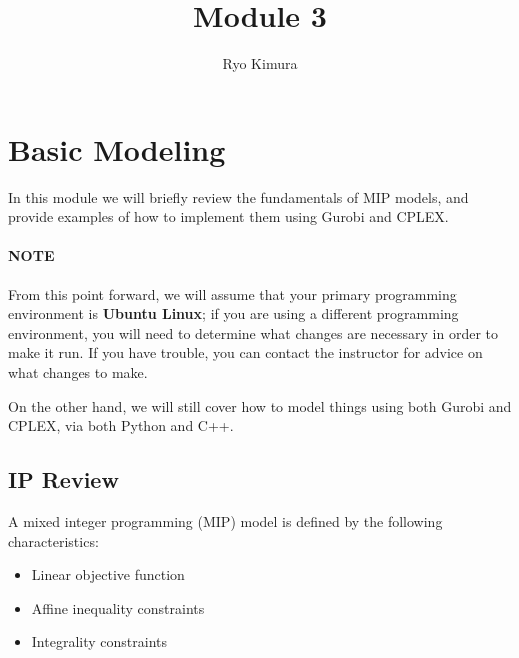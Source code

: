 \documentclass[12pt]{article}
\begin{document}
\title{Module 3}
\author{Ryo Kimura}
\maketitle

%
%
%
%
%

\setcounter{section}{2}
\section{Basic Modeling}
In this module we will briefly review the fundamentals of MIP models, and provide examples of how to implement them using Gurobi and CPLEX.

\paragraph{NOTE} From this point forward, we will assume that your primary programming environment is \textbf{Ubuntu Linux}; if you are using a different programming environment, you will need to determine what changes are necessary in order to make it run. If you have trouble, you can contact the instructor for advice on what changes to make.

On the other hand, we will still cover how to model things using both Gurobi and CPLEX, via both Python and C++.

\subsection{IP Review}
A mixed integer programming (MIP) model is defined by the following characteristics:
\begin{itemize}
    \item Linear objective function
    \item Affine inequality constraints
    \item Integrality constraints
\end{itemize}
\end{document}
